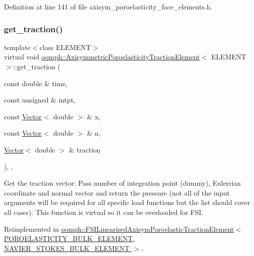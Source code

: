 Definition at line 141 of file axisym\+\_\+poroelasticity\+\_\+face\+\_\+elements.\+h.

\mbox{\label{classoomph_1_1AxisymmetricPoroelasticityTractionElement_a0d996e2947fe74e991d1f382cfa5491d}} 
\subsubsection{\texorpdfstring{get\+\_\+traction()}{get\_traction()}}
{\footnotesize\ttfamily template$<$class E\+L\+E\+M\+E\+NT$>$ \\
virtual void \hyperlink{classoomph_1_1AxisymmetricPoroelasticityTractionElement}{oomph\+::\+Axisymmetric\+Poroelasticity\+Traction\+Element}$<$ E\+L\+E\+M\+E\+NT $>$\+::get\+\_\+traction (\begin{DoxyParamCaption}\item[{const double \&}]{time,  }\item[{const unsigned \&}]{intpt,  }\item[{const \hyperlink{classoomph_1_1Vector}{Vector}$<$ double $>$ \&}]{x,  }\item[{const \hyperlink{classoomph_1_1Vector}{Vector}$<$ double $>$ \&}]{n,  }\item[{\hyperlink{classoomph_1_1Vector}{Vector}$<$ double $>$ \&}]{traction }\end{DoxyParamCaption})\hspace{0.3cm}{\ttfamily [inline]}, {\ttfamily [protected]}, {\ttfamily [virtual]}}



Get the traction vector\+: Pass number of integration point (dummy), Eulerrian coordinate and normal vector and return the pressure (not all of the input arguments will be required for all specific load functions but the list should cover all cases). This function is virtual so it can be overloaded for F\+SI. 



Reimplemented in \hyperlink{classoomph_1_1FSILinearisedAxisymPoroelasticTractionElement_ace2d9e5b5f0fbea991a95b5e1c0f7b80}{oomph\+::\+F\+S\+I\+Linearised\+Axisym\+Poroelastic\+Traction\+Element$<$ P\+O\+R\+O\+E\+L\+A\+S\+T\+I\+C\+I\+T\+Y\+\_\+\+B\+U\+L\+K\+\_\+\+E\+L\+E\+M\+E\+N\+T, N\+A\+V\+I\+E\+R\+\_\+\+S\+T\+O\+K\+E\+S\+\_\+\+B\+U\+L\+K\+\_\+\+E\+L\+E\+M\+E\+N\+T $>$}.



